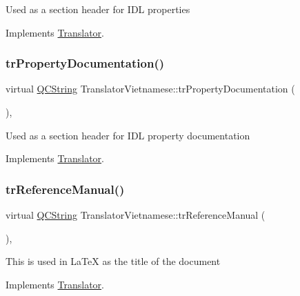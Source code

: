 Used as a section header for I\+DL properties 

Implements \mbox{\hyperlink{class_translator}{Translator}}.

\mbox{\label{class_translator_vietnamese_af91a54806ae5dd3780d2801d1c2cbb3c}} 
\subsubsection{\texorpdfstring{trPropertyDocumentation()}{trPropertyDocumentation()}}
{\footnotesize\ttfamily virtual \mbox{\hyperlink{class_q_c_string}{Q\+C\+String}} Translator\+Vietnamese\+::tr\+Property\+Documentation (\begin{DoxyParamCaption}{ }\end{DoxyParamCaption})\hspace{0.3cm}{\ttfamily [inline]}, {\ttfamily [virtual]}}

Used as a section header for I\+DL property documentation 

Implements \mbox{\hyperlink{class_translator}{Translator}}.

\mbox{\label{class_translator_vietnamese_ae8a8381fbce744a0d36b8f681c9b3bc0}} 
\subsubsection{\texorpdfstring{trReferenceManual()}{trReferenceManual()}}
{\footnotesize\ttfamily virtual \mbox{\hyperlink{class_q_c_string}{Q\+C\+String}} Translator\+Vietnamese\+::tr\+Reference\+Manual (\begin{DoxyParamCaption}{ }\end{DoxyParamCaption})\hspace{0.3cm}{\ttfamily [inline]}, {\ttfamily [virtual]}}

This is used in La\+TeX as the title of the document 

Implements \mbox{\hyperlink{class_translator}{Translator}}.

\mbox{\label{class_translator_vietnamese_a7ee37291a0f2666c144d4654013c46bc}} 
